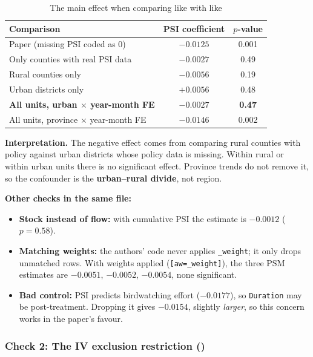 \documentclass[11pt]{article}
\begin{document}
\begin{table}[H]\centering\small
\caption{The main effect when comparing like with like}
\begin{tabularx}{\linewidth}{>{\raggedright\arraybackslash}Xcc}
\toprule
Comparison & PSI coefficient & $p$-value\\
\midrule
Paper (missing PSI coded as 0) & $-0.0125$ & 0.001\\
Only counties with real PSI data & $-0.0027$ & 0.49\\
Rural counties only & $-0.0056$ & 0.19\\
Urban districts only & $+0.0056$ & 0.48\\
\textbf{All units, urban $\times$ year-month FE} & $\mathbf{-0.0027}$ & \textbf{0.47}\\
All units, province $\times$ year-month FE & $-0.0146$ & 0.002\\
\bottomrule
\end{tabularx}
\end{table}
\begin{whybox}\small
\textbf{Interpretation.} The negative effect comes from comparing rural counties with policy against urban districts whose policy data is missing. Within rural or within urban units there is no significant effect. Province trends do not remove it, so the confounder is the \textbf{urban--rural divide}, not region.

\textbf{Other checks in the same file:}
\begin{itemize}[leftmargin=12pt]
\item \textbf{Stock instead of flow:} with cumulative PSI the estimate is $-0.0012$ ($p=0.58$).
\item \textbf{Matching weights:} the authors' code never applies \texttt{\_weight}; it only drops unmatched rows. With weights applied (\texttt{[aw=\_weight]}), the three PSM estimates are $-0.0051$, $-0.0052$, $-0.0054$, none significant.
\item \textbf{Bad control:} PSI predicts birdwatching effort ($-0.0177$), so \texttt{Duration} may be post-treatment. Dropping it gives $-0.0154$, slightly \emph{larger}, so this concern works in the paper's favour.
\end{itemize}
\end{whybox}

\subsubsection*{Check 2: The IV exclusion restriction ()}
\end{document}

